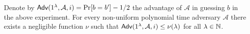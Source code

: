 \begin{definition}
\begin{itemize}
    Denote by ${\sf Adv}(1^\lambda,\mathcal{A},i)=\Pr[b=b']-1/2$ the advantage of $\mathcal{A}$ in guessing $b$ in the above experiment. For every non-uniform polynomial time adversary $\mathcal{A}$ there exists a negligible function $\nu$ such that ${\sf Adv}(1^\lambda,\mathcal{A},i) \le \nu(\lambda)$ for all $\lambda \in \mathbb{N}$.
\end{itemize}
\end{definition}

